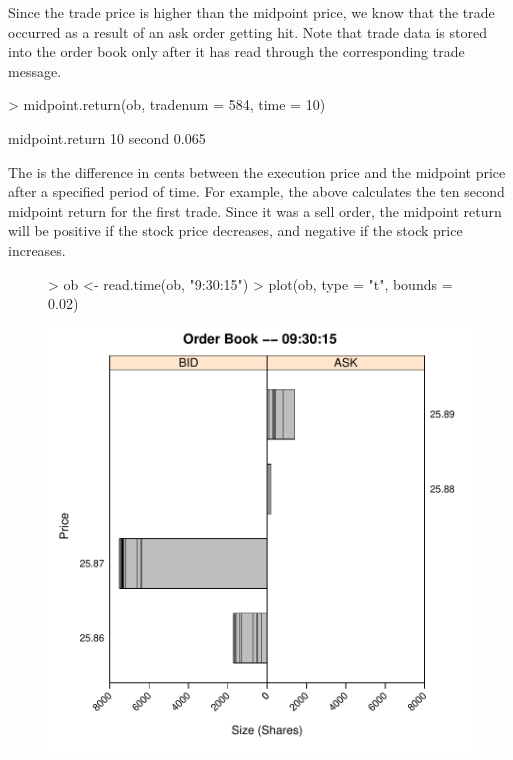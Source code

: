 Since the trade price is higher than the midpoint price, we know that
the trade occurred as a result of an ask order getting hit. Note that
trade data is stored into the order book only after it has read
through the corresponding trade message.

\begin{Schunk}
\begin{Sinput}
> midpoint.return(ob, tradenum = 584, time = 10)
\end{Sinput}
\begin{Soutput}
          midpoint.return
10 second           0.065
\end{Soutput}
\end{Schunk}

The  is the difference in cents between the
execution price and the midpoint price after a specified period of
time. For example, the above calculates the ten second midpoint return
for the first trade. Since it was a sell order, the midpoint return
will be positive if the stock price decreases, and negative if the
stock price increases.

\begin{figure}
\centering
\vspace*{.1in}
\begin{Schunk}
\begin{Sinput}
> ob <- read.time(ob, "9:30:15")
> plot(ob, type = "t", bounds = 0.02)
\end{Sinput}
\end{Schunk}
\includegraphics[scale = 0.5]{orderbook-015}
\end{figure}

